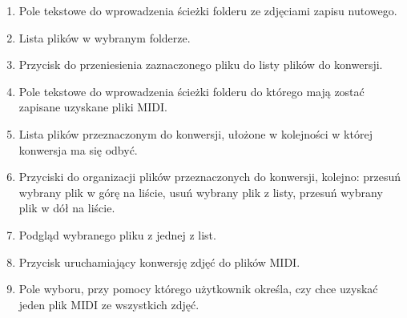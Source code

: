 \begin{enumerate}
	\item Pole tekstowe do wprowadzenia ścieżki folderu ze zdjęciami zapisu nutowego.
	\item Lista plików w wybranym folderze.
	\item Przycisk do przeniesienia zaznaczonego pliku do listy plików do konwersji.
	\item Pole tekstowe do wprowadzenia ścieżki folderu do którego mają zostać zapisane uzyskane pliki MIDI.
	\item Lista plików przeznaczonym do konwersji, ułożone w kolejności w której konwersja ma się odbyć.
	\item Przyciski do organizacji plików przeznaczonych do konwersji, kolejno: przesuń wybrany plik w górę na liście, usuń wybrany plik z listy, przesuń wybrany plik w dół na liście.
	\item Podgląd wybranego pliku z jednej z list.
	\item Przycisk uruchamiający konwersję zdjęć do plików MIDI.
	\item Pole wyboru, przy pomocy którego użytkownik określa, czy chce uzyskać jeden plik MIDI ze wszystkich zdjęć.
\end{enumerate}